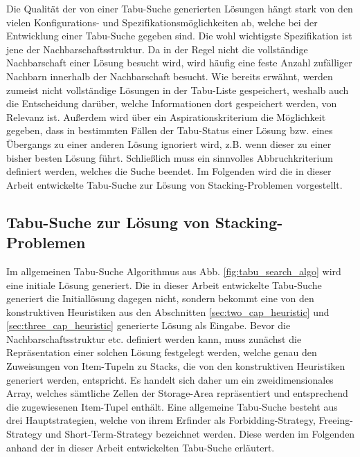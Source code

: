 Die Qualität der von einer Tabu-Suche generierten Lösungen hängt stark von den vielen
Konfigurations- und Spezifikationsmöglichkeiten ab, welche bei der Entwicklung einer Tabu-Suche gegeben sind.
Die wohl wichtigste Spezifikation ist jene der Nachbarschaftsstruktur. Da in der Regel nicht die vollständige Nachbarschaft einer Lösung besucht wird, wird häufig eine feste Anzahl zufälliger Nachbarn innerhalb der Nachbarschaft besucht. Wie bereits erwähnt, werden zumeist nicht vollständige Lösungen in der Tabu-Liste
gespeichert, weshalb auch die Entscheidung darüber, welche Informationen dort gespeichert werden,
von Relevanz ist. Außerdem wird über ein Aspirationskriterium die Möglichkeit gegeben, dass in bestimmten Fällen
der Tabu-Status einer Lösung bzw. eines Übergangs zu einer anderen Lösung ignoriert wird,
z.B. wenn dieser zu einer bisher besten Lösung führt. Schließlich muss ein sinnvolles
Abbruchkriterium definiert werden, welches die Suche beendet. Im Folgenden wird die in dieser Arbeit entwickelte
Tabu-Suche zur Lösung von Stacking-Problemen vorgestellt.

\vfill
\pagebreak

\subsection{Tabu-Suche zur Lösung von Stacking-Problemen}
\label{sec:tabu_search_for_sp}

Im allgemeinen Tabu-Suche Algorithmus aus Abb. \ref{fig:tabu_search_algo} wird eine initiale Lösung generiert.
Die in dieser Arbeit entwickelte Tabu-Suche generiert die Initiallösung dagegen nicht, sondern bekommt eine
von den konstruktiven Heuristiken aus den Abschnitten \ref{sec:two_cap_heuristic}
und \ref{sec:three_cap_heuristic} generierte Lösung als Eingabe. Bevor die Nachbarschaftsstruktur etc. definiert werden kann, muss zunächst die Repräsentation einer solchen Lösung festgelegt werden, welche genau den Zuweisungen von Item-Tupeln zu Stacks, die von den konstruktiven Heuristiken generiert werden, entspricht. Es handelt sich daher um ein zweidimensionales Array, welches sämtliche Zellen der Storage-Area repräsentiert und entsprechend die zugewiesenen Item-Tupel enthält.\newline
Eine allgemeine Tabu-Suche besteht aus drei Hauptstrategien, welche von ihrem Erfinder \citet{Glover90} als Forbidding-Strategy,
Freeing-Strategy und Short-Term-Strategy bezeichnet werden. Diese werden im Folgenden anhand der in dieser Arbeit entwickelten Tabu-Suche erläutert.

